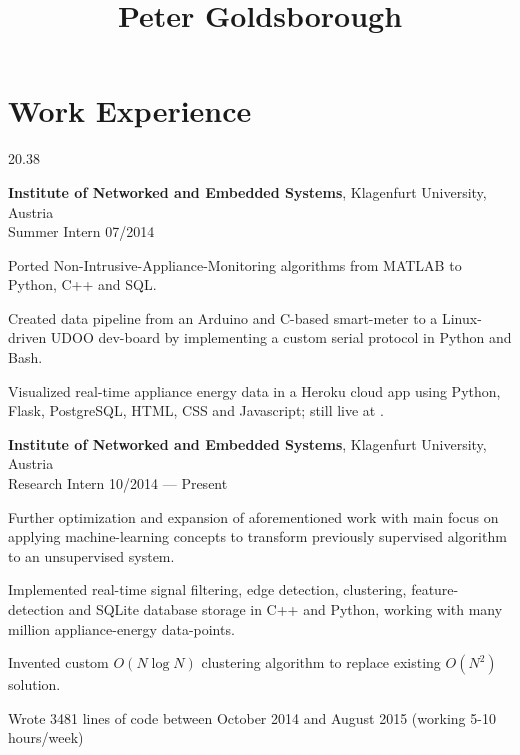 




\begin{header}
	\title{Peter Goldsborough}
	\separate
	\separate
\end{header}

\section{Work Experience}{2}{0.38}

\begin{entry}
	{\textbf{Institute of Networked and Embedded Systems}, Klagenfurt University, Austria}
	{\\Summer Intern}
	{07/2014}

	\item Ported Non-Intrusive-Appliance-Monitoring algorithms from MATLAB to Python, C++ and SQL.
	\item Created data pipeline from an Arduino and C-based smart-meter to a Linux-driven UDOO dev-board by implementing a custom serial protocol in Python and Bash.
	\item Visualized real-time appliance energy data in a Heroku cloud app using Python, Flask, PostgreSQL, HTML, CSS and Javascript; still live at .
\end{entry}

\begin{entry}
	{\textbf{Institute of Networked and Embedded Systems}, Klagenfurt University, Austria}
	{\\Research Intern}
	{10/2014 --- Present}
	\item Further optimization and expansion of aforementioned work with main focus on applying machine-learning concepts to transform previously supervised algorithm to an unsupervised system.
	\item Implemented real-time signal filtering, edge detection, clustering, feature-detection and SQLite database storage in C++ and Python, working with many million appliance-energy data-points.
	\item Invented custom $O(N \log N)$ clustering algorithm to replace existing $O(N^2)$ solution.
	\item Wrote 3481 lines of code between October 2014 and August 2015 (working 5-10 hours/week)
\end{entry}

